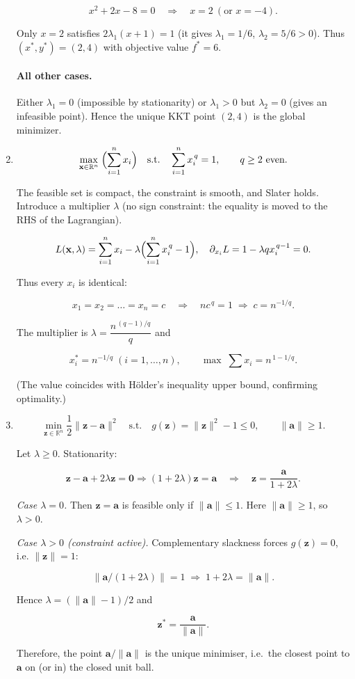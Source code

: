 \documentclass{article}
\begin{document}
\begin{enumerate}
\[
x^{2}+2x-8=0 \quad\Longrightarrow\quad x=2\ (\text{or }x=-4).
\]

Only $x=2$ satisfies $2\lambda_{1}(x+1)=1$ (it gives $\lambda_{1}=1/6$,
$\lambda_{2}=5/6>0$).  
Thus $(x^{*},y^{*})=(2,4)$ with objective value $f^{*}=6$.

\paragraph{All other cases.}
Either $\lambda_{1}=0$ (impossible by stationarity) or
$\lambda_{1}>0$ but $\lambda_{2}=0$ (gives an infeasible point).  
Hence the unique KKT point $(2,4)$ is the global minimizer.

\item
\[
\max_{\mathbf x\in\mathbb R^{n}}\;
\Bigl(\sum_{i=1}^{n}x_{i}\Bigr)
\quad\text{s.t.}\quad
\sum_{i=1}^{n}x_{i}^{\,q}=1,
\qquad q\ge 2\text{ even}.
\]

The feasible set is compact, the constraint is smooth, and Slater holds.
Introduce a multiplier $\lambda$ (no sign constraint: the equality
is moved to the RHS of the Lagrangian).

\[
L(\mathbf x,\lambda)=
\sum_{i=1}^{n}x_{i}-\lambda\Bigl(\sum_{i=1}^{n}x_{i}^{\,q}-1\Bigr),
\quad
\partial_{x_{i}}L=1-\lambda qx_{i}^{\,q-1}=0.
\]

Thus every $x_{i}$ is identical:

\[
x_{1}=x_{2}=\dots=x_{n}=c
\quad\Longrightarrow\quad
nc^{\,q}=1\;\Longrightarrow\;c=n^{-1/q}.
\]

The multiplier is $\lambda=\dfrac{n^{\,(q-1)/q}}{q}$ and

\[
x_{i}^{*}=n^{-1/q}\;(i=1,\dots,n),\qquad
\max\; \sum x_{i}=n^{\,1-1/q} .
\]

(The value coincides with Hölder’s inequality upper bound, confirming
optimality.)

\item
\[
\min_{\mathbf z\in\mathbb R^{n}}
\frac12\|\mathbf z-\mathbf a\|^{2}
\quad\text{s.t.}\quad
g(\mathbf z)=\|\mathbf z\|^{2}-1\le 0,
\qquad\|\mathbf a\|\ge 1.
\]

Let $\lambda\ge 0$.  
Stationarity:

\[
\mathbf z-\mathbf a+2\lambda\mathbf z=\mathbf 0
\Longrightarrow
(1+2\lambda)\mathbf z=\mathbf a
\quad\Longrightarrow\quad
\mathbf z=\frac{\mathbf a}{1+2\lambda}.
\]

\emph{Case $\lambda=0$.}  
Then $\mathbf z=\mathbf a$ is feasible only if $\|\mathbf a\|\le 1$.  
Here $\|\mathbf a\|\ge1$, so $\lambda>0$.

\emph{Case $\lambda>0$ (constraint active).}  
Complementary slackness forces $g(\mathbf z)=0$, i.e. $\|\mathbf z\|=1$:

\[
\bigl\|{\mathbf a}/{(1+2\lambda)}\bigr\|=1
\;\Longrightarrow\;
1+2\lambda=\|\mathbf a\|.
\]

Hence $\lambda=(\|\mathbf a\|-1)/2$ and

\[
\mathbf z^{*}=\dfrac{\mathbf a}{\|\mathbf a\|}.
\]

Therefore, the point $\mathbf a/\|\mathbf a\|$ is the unique minimiser,
i.e.\ the closest point to $\mathbf a$ on (or in) the closed unit ball.
\end{enumerate}
\end{document}
